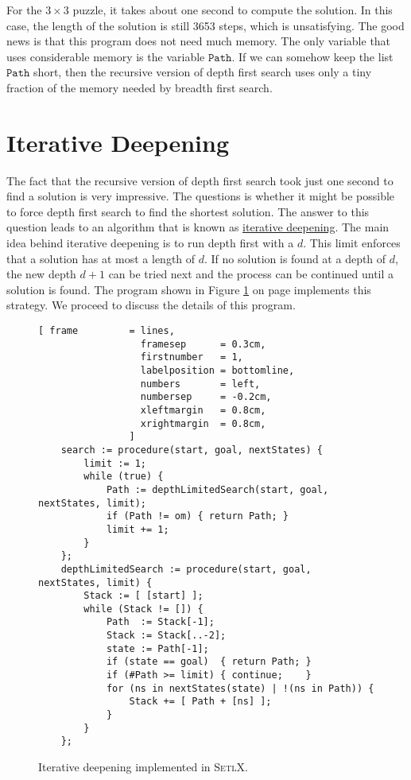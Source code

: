 For the $3 \times 3$ puzzle, it takes about one second to compute the solution.  In this case, the length of
the solution is still 3653 steps, which is unsatisfying.  The good news is that this program does not
need much memory.  The only variable that uses considerable memory is the variable $\mathtt{Path}$.
If we can somehow keep the list $\mathtt{Path}$ short, then the recursive version of depth first search uses only a
tiny fraction of the memory needed by breadth first search.

\section{Iterative Deepening}
The fact that the recursive version of depth first search took just one second to find a solution is
very impressive.  The questions is whether it might be possible to force depth first search to find
the shortest solution.  The answer to this question leads to an algorithm that is known as
\href{https://en.wikipedia.org/wiki/Iterative_deepening_depth-first_search}{iterative deepening}.  The main
idea behind iterative deepening is to run depth first with a  $d$.  This limit
enforces that a solution has at most a length of $d$.  If no solution is found at a depth of $d$, the new depth
$d+1$ can be tried next and the process can be continued until a solution is found.  The program shown in
Figure \ref{fig:iterative-deepening.stlx} on page \pageref{fig:iterative-deepening.stlx} implements this strategy.
We proceed to discuss the details of this program.

\begin{figure}[!ht]
\centering
\begin{Verbatim}[ frame         = lines,
                  framesep      = 0.3cm,
                  firstnumber   = 1,
                  labelposition = bottomline,
                  numbers       = left,
                  numbersep     = -0.2cm,
                  xleftmargin   = 0.8cm,
                  xrightmargin  = 0.8cm,
                ]
    search := procedure(start, goal, nextStates) {
        limit := 1;
        while (true) {
            Path := depthLimitedSearch(start, goal, nextStates, limit);
            if (Path != om) { return Path; }
            limit += 1;
        }
    };
    depthLimitedSearch := procedure(start, goal, nextStates, limit) {
        Stack := [ [start] ];
        while (Stack != []) {
            Path  := Stack[-1];
            Stack := Stack[..-2];
            state := Path[-1];
            if (state == goal)  { return Path; }
            if (#Path >= limit) { continue;    }
            for (ns in nextStates(state) | !(ns in Path)) {
                Stack += [ Path + [ns] ];
            }
        }
    };
\end{Verbatim}
\vspace*{-0.3cm}
\caption{Iterative deepening implemented in \textsc{SetlX}.}
\label{fig:iterative-deepening.stlx}
\end{figure}

